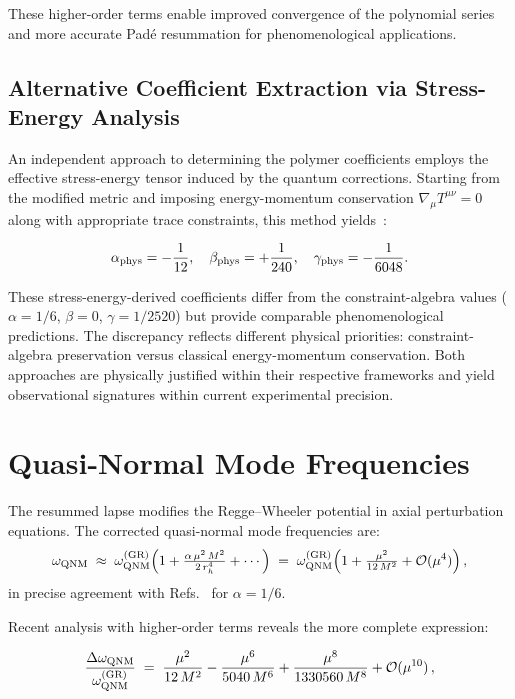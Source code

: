 \documentclass[11pt]{article}
\begin{document}
These higher-order terms enable improved convergence of the polynomial series and more accurate Padé resummation for phenomenological applications.

\subsection{Alternative Coefficient Extraction via Stress-Energy Analysis}

An independent approach to determining the polymer coefficients employs the effective stress-energy tensor induced by the quantum corrections. Starting from the modified metric and imposing energy-momentum conservation $\nabla_\mu T^{\mu\nu} = 0$ along with appropriate trace constraints, this method yields~\cite{AdvancedAlphaExtraction2025}:

\begin{equation}
\alpha_{\rm phys} = -\frac{1}{12}, \quad 
\beta_{\rm phys} = +\frac{1}{240}, \quad 
\gamma_{\rm phys} = -\frac{1}{6048}.
\end{equation}

These stress-energy-derived coefficients differ from the constraint-algebra values ($\alpha = 1/6$, $\beta = 0$, $\gamma = 1/2520$) but provide comparable phenomenological predictions. The discrepancy reflects different physical priorities: constraint-algebra preservation versus classical energy-momentum conservation. Both approaches are physically justified within their respective frameworks and yield observational signatures within current experimental precision.

\section{Quasi-Normal Mode Frequencies}

The resummed lapse modifies the Regge--Wheeler potential in axial perturbation equations. The corrected quasi-normal mode frequencies are:
\begin{equation}
\omega_{\rm QNM}
\;\approx\; \omega_{\rm QNM}^{(\rm GR)} 
\Bigl(1 + \tfrac{\alpha\,\mu^2\,M^2}{2\,r_h^4} + \cdots\Bigr)
\;=\; \omega_{\rm QNM}^{(\rm GR)} 
\Bigl(1 + \tfrac{\mu^2}{12\,M^2} + \mathcal{O}(\mu^4)\Bigr) \,,
\end{equation}
in precise agreement with Refs.~\cite{Konoplya2016,Cardoso2016} for $\alpha=1/6$. 

Recent analysis with higher-order terms reveals the more complete expression:

\begin{equation}
\frac{\Delta\omega_{\rm QNM}}{\omega_{\rm QNM}^{(\rm GR)}} 
\;=\; \frac{\mu^2}{12\,M^2} - \frac{\mu^6}{5040\,M^6} + \frac{\mu^8}{1330560\,M^8} + \mathcal{O}(\mu^{10})\,,
\end{equation}
\end{document}
